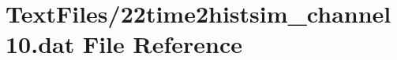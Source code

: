 \hypertarget{22time2histsim__channel10_8dat}{}\section{Text\+Files/22time2histsim\+\_\+channel10.dat File Reference}
\label{22time2histsim__channel10_8dat}
